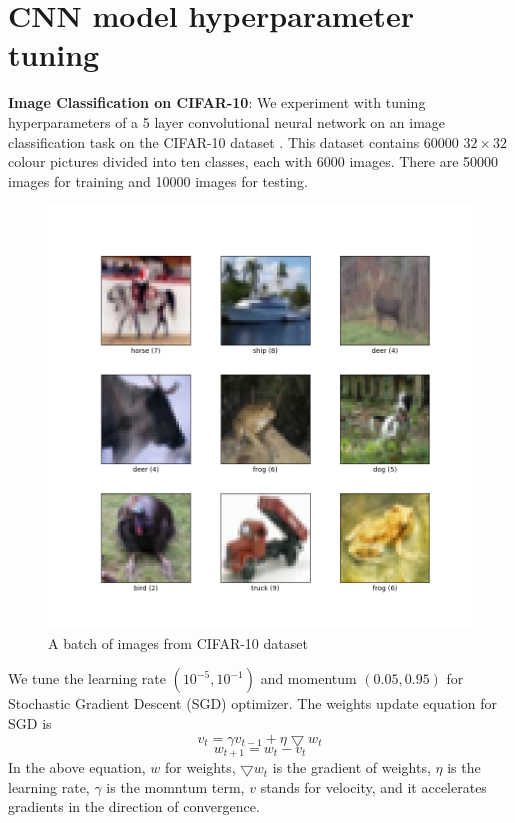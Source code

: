 \section{CNN model hyperparameter tuning}\label{sec:cnn-model}
\textbf{Image Classification on CIFAR-10}: We experiment with tuning hyperparameters of a 5 layer convolutional neural network on an image classification task on the CIFAR-10 dataset \cite{cifar10}. This dataset contains 60000 $32\times32$ colour pictures divided into ten classes, each with 6000 images. There are 50000 images for training and 10000 images for testing.
\begin{figure}[H]
	\centering
	\includegraphics[scale=0.3]{figures/cifar10.png}
	\caption{A batch of images from CIFAR-10 dataset}
	\label{fig:cifar-10-dataset}
\end{figure}

We tune the learning rate $(10^{-5}, 10^{-1})$ and momentum $(0.05, 0.95)$ for Stochastic Gradient Descent (SGD) optimizer. The weights update equation for SGD is
$$ v_t = \gamma v_{t-1} + \eta \bigtriangledown w_t $$
$$ w_{t+1} = w_t - v_t $$
In the above equation, $w$ for weights, $\bigtriangledown w_t$ is the gradient of weights, $\eta$ is the learning rate, $\gamma$ is the momntum term, $v$ stands for velocity, and it accelerates gradients in the direction of convergence.

